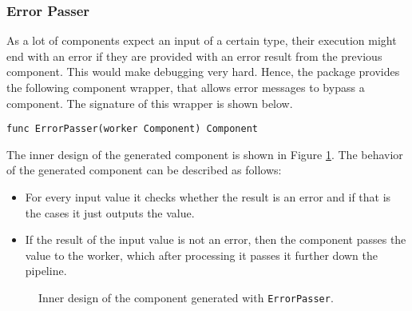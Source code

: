 \subsubsection{Error Passer}
As a lot of components expect an input of a certain type, their execution
might end with an error if they are provided with an error result from
the previous component. This would make debugging very hard. Hence, the 
package provides the following component wrapper, that allows error messages
to bypass a component. The signature of this wrapper is shown below.
\begin{lstlisting}
func ErrorPasser(worker Component) Component
\end{lstlisting}
The inner design of the generated component is shown in Figure 
\ref{fig:errPasserDiag}. The behavior of the generated component 
can be described as follows:
\begin{itemize}
	\item For every input value it checks whether the result is an error
		  and if that is the cases it just outputs the value.
	\item If the result of the input value is not an error, then the component
		  passes the value to the worker, which after processing it passes 
		  it further down the pipeline.
\end{itemize}

\begin{figure}[h]
\centering
{}
\caption[scale=1.0]{Inner design of the component generated with
  \texttt{ErrorPasser}.}
\label{fig:errPasserDiag}
\end{figure}

